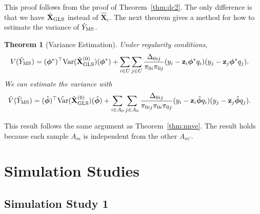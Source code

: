 \documentclass[12pt]{article}
\newtheorem{theorem}{Theorem}
\newcommand{\Var}{{\text{Var}}}
\renewcommand{\bf}[1]{\mathbf{#1}}
\begin{document}
This proof follows from the proof of Theorem~\ref{thm:dc2}. The only
difference is that we have $\hat{\bf X}_{\rm GLS}$ instead of $\hat{\bf X}_c$.
The next theorem gives a method for how to estimate the variance of 
$\hat Y_{\rm MS}$.

\begin{theorem}[Variance Estimation]
  Under regularity conditions,
  $$
  \begin{aligned}
    V(\hat Y_{\rm MS}) 
    &= (\bm \phi^{*})^\top \Var(\hat{\bf X}_{\rm GLS}^{(0)}) (\bm \phi^{*}) + 
      \sum_{i \in U} \sum_{j \in U} \frac{\Delta_{0ij}}{\pi_{0i}\pi_{0j}}
      (y_i - \bf z_i\bm \phi^{*}q_i)
      (y_j - \bf z_j\bm \phi^{*}q_j). 
  \end{aligned}
  $$
  We can estimate the variance with
  $$
  \begin{aligned}
    \hat V(\hat Y_{\rm MS}) 
    &= (\hat{\bm \phi})^\top \hat \Var(\hat{\bf X}_{\rm GLS}^{(0)}) (\hat{\bm \phi})
    + \sum_{i \in A_0} \sum_{j \in A_0} \frac{\Delta_{0ij}}{\pi_{0ij}\pi_{0i}\pi_{0j}}
      (y_i - \bf z_i \hat{\bm \phi}q_i)
      (y_j - \bf z_j \hat{\bm \phi}q_j). 
  \end{aligned}
  $$

\end{theorem}

This result follows the same argument as Theorem~\eqref{thm:nnve}. The result
holds because each sample $A_m$ is independent from the other $A_{m'}$.

\section{Simulation Studies}

\subsection{Simulation Study 1}
\end{document}
